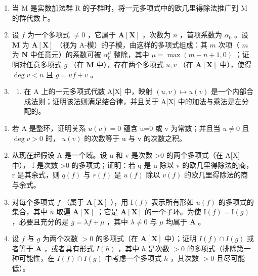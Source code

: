 \BourbakiExerciseGroup

\begin{enumerate}
\def\labelenumi{\arabic{enumi})}
\item
  当 M 是实数加法群 R 的子群时，将一元多项式中的欧几里得除法推广到 M 的群代数上。
\item
  设 \(f\) 为一个多项式 \(\neq 0\) ，它属于 \(\mathbf{A}[\mathbf{X}]\) ，次数为 \(n\) ，首项系数为 \(\alpha_0\) 。设 \(\mathbf{M}\) 为 \(\mathbf{A}[\mathbf{X}]\) （视为 A-模）的子模，由这样的多项式组成：其 \(m\) 次项（ \(m\) 为 \(\mathbf{N}\) 中任意元）的系数可被 \(\alpha_0^\mu\) 整除，其中 \(\mu = \max(m - n + 1, 0)\) ；证明对任意多项式 \(g\) （在 \(\mathbf{M}\) 中），存在两个多项式 \(u, v\) （在 \(\mathbf{A}[\mathbf{X}]\) 中），使得 \(\deg v < n\) 且 \(g = uf + v\) 。
\item
  \begin{enumerate}
  \def\labelenumii{\alph{enumii})}
  \tightlist
  \item
    在 A 上的一元多项式代数 A{[}X{]} 中，映射 \((u,v)\mapsto u(v)\) 是一个内部合成法则；证明该法则满足结合律，并且关于 A{[}X{]} 中的加法与乘法是左分配的。
  \end{enumerate}
\end{enumerate}

\begin{enumerate}
\def\labelenumi{\alph{enumi})}
\setcounter{enumi}{1}
\item
  若 A 是整环，证明关系 \(u(v)=0\) 蕴含 u=0 或 v 为常数；并且当 \(u\neq0\) 且 \(\deg v>0\) 时， \(u(v)\) 的次数等于 u 与 v 的次数之积。
\item
  从现在起假设 A 是一个域。设 u 和 v 是次数 \textgreater0 的两个多项式（在 A{[}X{]} 中）， f 是次数 \textgreater0 的多项式；证明：若 q 是 u 除以 v 的欧几里得除法的商， r 是其余式，则 \(q(f)\) 与 \(r(f)\) 是 \(u(f)\) 除以 \(v(f)\) 的欧几里得除法的商与余式。
\item
  对每个多项式 \(f\) （属于 \(\mathbf{A}[\mathbf{X}]\) ），用 \(\mathrm{I}(f)\) 表示所有形如 \(u(f)\) 的多项式的集合，其中 \(u\) 取遍 \(\mathbf{A}[\mathbf{X}]\) ；它是 \(\mathbf{A}[\mathbf{X}]\) 的一个子环。为使 \(\mathrm{I}(f) = \mathrm{I}(g)\) ，必要且充分的是 \(g = \lambda f + \mu\) ，其中 \(\lambda \neq 0\) 与 \(\mu\) 均属于 \(\mathbf{A}\) 。
\item
  设 \(f\) 与 \(g\) 为两个次数 \(> 0\) 的多项式（在 \(\mathbf{A}[\mathbf{X}]\) 中）；证明 \(I(f) \cap I(g)\) 或者等于 \(\mathbf{A}\) ，或者具有形式 \(I(h)\) ，其中 \(h\) 是次数 \(> 0\) 的多项式（排除第一种可能性，在 \(I(f) \cap I(g)\) 中考虑一个多项式 \(h\) ，其次数 \(> 0\) 且尽可能低）。
\end{enumerate}

